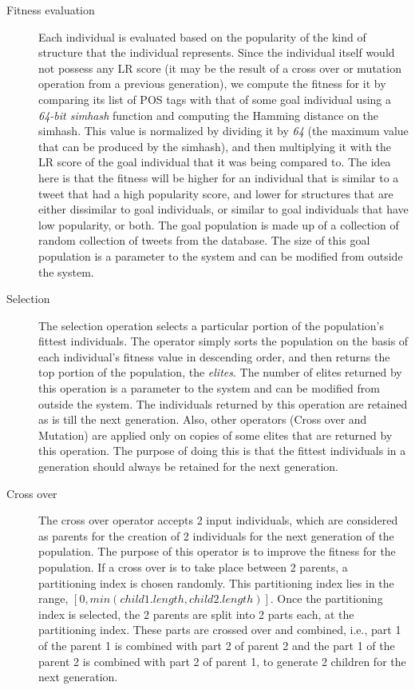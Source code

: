 \begin{description}
\item [Fitness evaluation] Each individual is evaluated based on the popularity of the kind of structure that the individual represents. Since the individual itself would not possess any LR score (it may be the result of a cross over or mutation operation from a previous generation), we compute the fitness for it by comparing its list of POS tags with that of some goal individual using a \textit{64-bit simhash} function and computing the Hamming distance on the simhash. This value is normalized by dividing it by \textit{64} (the maximum value that can be produced by the simhash), and then multiplying it with the LR score of the goal individual that it was being compared to. The idea here is that the fitness will be higher for an individual that is similar to a tweet that had a high popularity score, and lower for structures that are either dissimilar to goal individuals, or similar to goal individuals that have low popularity, or both. 
\linebreak
The goal population is made up of a collection of random collection of tweets from the database. The size of this goal population is a parameter to the system and can be modified from outside the system.
\item[Selection] The selection operation selects a particular portion of the population's fittest individuals. The operator simply sorts the population on the basis of each individual's fitness value in descending order, and then returns the top portion of the population, the \textit{elites}. The number of elites returned by this operation is a parameter to the system and can be modified from outside the system. The individuals returned by this operation are retained as is till the next generation. Also, other operators (Cross over and Mutation) are applied only on copies of some elites that are returned by this operation. The purpose of doing this is that the fittest individuals in a generation should always be retained for the next generation.
\item[Cross over] The cross over operator accepts 2 input individuals, which are considered as parents for the creation of 2 individuals for the next generation of the population. The purpose of this operator is to improve the fitness for the population. If a cross over is to take place between 2 parents, a partitioning index is chosen randomly. This partitioning index lies in the range, $[0, min(child1.length, child2.length)]$. Once the partitioning index is selected, the 2 parents are split into 2 parts each, at the partitioning index. These parts are crossed over and combined, i.e., part 1 of the parent 1 is combined with part 2 of parent 2 and the part 1 of the parent 2 is combined with part 2 of parent 1, to generate 2 children for the next generation.

\end{description}
